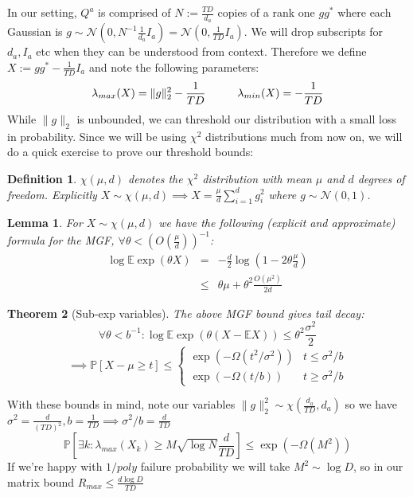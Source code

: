 \documentclass{article}
\newtheorem{theorem}{Theorem}
\newtheorem{lemma}[theorem]{Lemma}
\newtheorem{definition}{Definition}
\newcommand{\E}{\mathbb{E}}
\renewcommand{\Pr}{\mathbb{P}}
\begin{document}
In our setting, $Q^{a}$ is comprised of $N := \frac{TD}{d_{a}}$ copies of a rank one $g g^{*}$ where each Gaussian is $g \sim \mathcal{N}(0, N^{-1} \frac{1}{d_{a}} I_{a} ) = \mathcal{N}(0, \frac{1}{TD} I_{a}) $. We will drop subscripts for $d_{a}, I_{a}$ etc when they can be understood from context. Therefore we define $X := g g^{*} - \frac{1}{TD} I_{a}$ and note the following parameters:
\[ \lambda_{max}(X) = \|g\|_{2}^{2} - \frac{1}{TD} \hspace{10mm} \lambda_{min}(X) = - \frac{1}{TD}   \]
While $\|g\|_{2}$ is unbounded, we can threshold our distribution with a small loss in probability. Since we will be using $\chi^{2}$ distributions much from now on, we will do a quick exercise to prove our threshold bounds:

\begin{definition}
$\chi(\mu,d)$ denotes the $\chi^{2}$ distribution with mean $\mu$ and $d$ degrees of freedom. Explicitly $X \sim \chi(\mu,d) \implies X = \frac{\mu}{d} \sum_{i=1}^{d} g_{i}^{2}$
where $g \sim \mathcal{N}(0,1)$.
\end{definition}

\begin{lemma}
For $X \sim \chi(\mu,d)$ we have the following (explicit and approximate) formula for the MGF, $\forall \theta < \left(O(\frac{\mu}{d}) \right)^{-1}$:
\begin{eqnarray*} \log \E \exp(\theta X) & = & - \frac{d}{2} \log \left(1 - 2 \theta \frac{\mu}{d} \right)
\\ & \leq & \theta \mu + \theta^{2} \frac{O(\mu^{2})}{2 d}
\end{eqnarray*}
\end{lemma}

\begin{theorem} [Sub-exp variables]
The above MGF bound gives tail decay:
\[ \forall \theta < b^{-1}: \log \E \exp(\theta (X - \E X)) \leq \theta^{2} \frac{\sigma^{2}}{2} \]
\[ \implies  \Pr[X - \mu \geq t] \leq \begin{cases}
\exp( - \Omega(t^{2}/\sigma^{2}) ) & t \leq \sigma^{2}/b
\\ \exp( - \Omega(t/b) ) & t \geq \sigma^{2}/b
\end{cases}   \]
\end{theorem}

With these bounds in mind, note our variables $\|g\|_{2}^{2} \sim \chi(\frac{d_{a}}{TD},d_{a})$ so we have $\sigma^{2} = \frac{d}{(TD)^{2}}, b = \frac{1}{TD} \implies \sigma^{2}/b = \frac{d}{TD}$
\[ \Pr[ \exists k: \lambda_{max}(X_{k}) \geq M \sqrt{\log N}\frac{d}{TD} ] \leq \exp( - \Omega(M^{2}) )  \]
If we're happy with $1/poly$ failure probability we will take $M^{2} \sim \log D$, so in our matrix bound $R_{max} \leq \frac{d \log D}{TD}$
\end{document}
